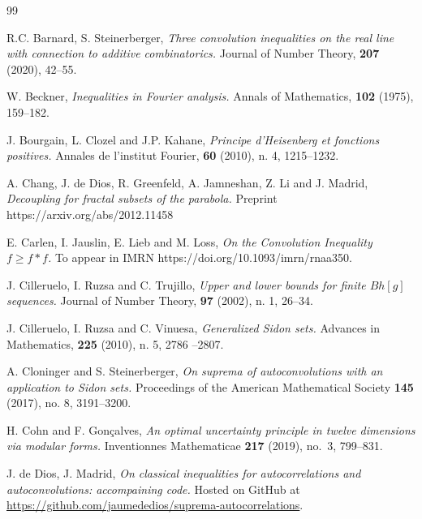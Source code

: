 \documentclass[10pt,reqno]{amsart}
\begin{document}
\begin{thebibliography}{99}

\newblock R.C. Barnard, S. Steinerberger,
\newblock \emph{Three convolution inequalities on the real line with connection to additive combinatorics.}
\newblock Journal of Number Theory, \textbf{207} (2020), 42--55. 

\newblock W. Beckner, 
\newblock \emph{Inequalities in Fourier analysis.} 
\newblock  Annals of Mathematics, \textbf{102} (1975), 159--182. 

\newblock  J. Bourgain, L. Clozel and J.P. Kahane, 
\newblock \emph{Principe d’Heisenberg et fonctions positives.}
\newblock Annales de l’institut Fourier, \textbf{60} (2010), n. 4, 1215--1232.

 A. Chang, J. de Dios, R. Greenfeld, A. Jamneshan, Z. Li and J. Madrid,
 \newblock \emph{Decoupling for fractal subsets of the parabola.}
\newblock Preprint https://arxiv.org/abs/2012.11458

 E. Carlen, I. Jauslin, E. Lieb and M. Loss,
 \newblock \emph{On the Convolution Inequality $f\geq f*f$.}
\newblock To appear in IMRN https://doi.org/10.1093/imrn/rnaa350.

\newblock J. Cilleruelo, I. Ruzsa and C. Trujillo,
\newblock \emph{Upper and lower bounds for finite $Bh[g]$ sequences.}
\newblock Journal of Number Theory, \textbf{97} (2002), n. 1, 26--34.

\newblock J. Cilleruelo, I. Ruzsa and C. Vinuesa,
\newblock \emph{Generalized Sidon sets.}
\newblock Advances in Mathematics, \textbf{225} (2010), n. 5, 2786 --2807.

\newblock A. Cloninger and S. Steinerberger, 
\newblock \emph{On suprema of autoconvolutions with an application to Sidon sets.}
\newblock Proceedings of the American Mathematical Society \textbf{145} (2017), no. 8, 3191--3200.

\newblock H. Cohn and F. Gon\c{c}alves,
\newblock \emph{An optimal uncertainty principle in twelve dimensions via modular forms.}
\newblock Inventionnes Mathematicae {\bf 217} (2019), no.~3, 799--831. 

\newblock  J. de Dios, J. Madrid, 
\newblock \emph{On classical inequalities for autocorrelations and autoconvolutions: accompaining code.}
\newblock Hosted on GitHub at \url{https://github.com/jaumededios/suprema-autocorrelations}.


\end{thebibliography}
\end{document}
